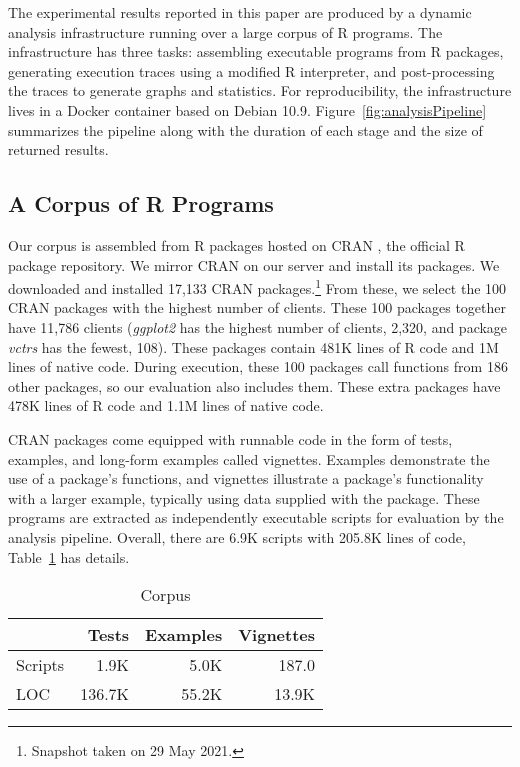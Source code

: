 \documentclass[10pt,sigplan,authorversion=true]{acmart}
\newcommand{\ggplot}{\textit{ggplot2}\xspace}
\newcommand{\vctrs}{\textit{vctrs}\xspace}
\begin{document}
The experimental results reported in this paper are produced by a dynamic
analysis infrastructure running over a large corpus of R programs. The
infrastructure has three tasks: assembling executable programs from R packages,
generating execution traces using a modified R interpreter, and post-processing
the traces to generate graphs and statistics. For reproducibility, the
infrastructure lives in a Docker container based on Debian 10.9.
Figure~\ref{fig:analysisPipeline} summarizes the pipeline along with the
duration of each stage and the size of returned results.

\subsection{A Corpus of R Programs}

Our corpus is assembled from R packages hosted on CRAN \cite{ligges2017}, the
official R package repository. We mirror CRAN on our server and install its
packages. We downloaded and installed 17,133 CRAN packages.\footnote{Snapshot
taken on 29 May 2021.} From these, we select the 100 CRAN packages with the highest
number of clients. These 100 packages together have 11,786 clients (\ggplot has
the highest number of clients, 2,320, and package \vctrs has the fewest, 108).
These packages contain 481K lines of R code and 1M lines of native code. During
execution, these 100 packages call functions from 186 other packages, so our
evaluation also includes them. These extra packages have 478K lines of R code
and 1.1M lines of native code.

CRAN packages come equipped with runnable code in the form of tests, examples,
and long-form examples called vignettes. Examples demonstrate the use of a
package's functions, and vignettes illustrate a package's functionality with a
larger example, typically using data supplied with the package. These programs
are extracted as independently executable scripts for evaluation by the analysis
pipeline. Overall, there are 6.9K scripts with 205.8K lines of code,
Table~\ref{table:corpus} has details.

\begin{table}[!h]   \small  \centering
  \caption{Corpus}\label{table:corpus}
  \vspace{-3mm}
  \begin{tabular}{lrrr}    \toprule
    &\bf Tests&\bf Examples&\bf Vignettes\\    \midrule
    {Scripts}&1.9K&5.0K&187.0\\    \midrule
    {LOC}&136.7K&55.2K&13.9K\\
    \bottomrule
  \end{tabular}
\end{table}
\end{document}
